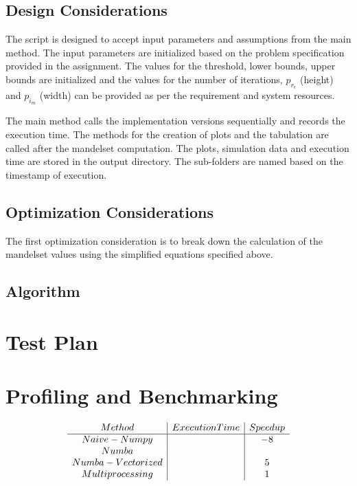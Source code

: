\documentclass{article}
\begin{document}
\subsection{Design Considerations}
The script is designed to accept input parameters and assumptions from the main method. The input parameters are initialized based on the problem specification provided in the assignment. The values for the threshold, lower bounds, upper bounds are initialized and the values for the number of iterations,  $p_{r_e}$ (height) and $p_{i_m}$ (width) can be provided as per the requirement and system resources.

The main method calls the implementation versions sequentially and records the execution time. The methods for the creation of plots and the tabulation are called after the mandelset computation. The plots, simulation data and execution time are stored in the output directory. The sub-folders are named based on the timestamp of execution.    

\subsection{Optimization Considerations}
The first optimization consideration is to break down the calculation of the mandelset values using the simplified equations specified above. 


\subsection{Algorithm}

\section{Test Plan}



\section{Profiling and Benchmarking}

\begin{align}
    \begin{array}{c | c | c}
         Method  & Execution Time & Speedup \\ 
         \hline %
         Naive-Numpy   &  & -8 \\
         Numba      &  &    \\
         Numba - Vectorized &  & 5 \\
         Multiprocessing &  & 1 \\
    \end{array}
\end{align}
\end{document}
